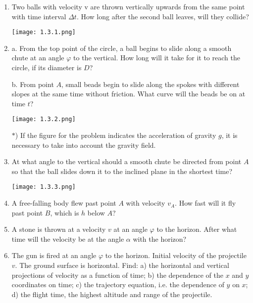 \documentclass{article}
\begin{document}
\begin{enumerate}[label=1.3.\arabic*]

\item Two balls with velocity v are thrown vertically upwards from the same point with time interval $\Delta t$. How long after the second ball leaves, will they collide?

\begin{center}
    \texttt{[image: 1.3.1.png]}
\end{center}

\item a. From the top point of the circle, a ball begins to slide along a smooth chute at an angle $\varphi$ to the vertical. How long will it take for it to reach the circle, if its diameter is $D$?

b. From point $A$, small beads begin to slide along the spokes with different slopes at the same time without friction. What curve will the beads be on at time $t$?

\begin{center}
    \texttt{[image: 1.3.2.png]}
\end{center}

$\ast$) If the figure for the problem indicates the acceleration of gravity $g$, it is necessary to take into account the gravity field.

\item At what angle to the vertical should a smooth chute be directed from point $A$ so that the ball slides down it to the inclined plane in the shortest time?

\begin{center}
    \texttt{[image: 1.3.3.png]}
\end{center}

\item A free-falling body flew past point $A$ with velocity $v_A$. How fast will it fly past point $B$, which is $h$ below $A$?

\item A stone is thrown at a velocity $v$ at an angle $\varphi$ to the horizon. After what time will the velocity be at the angle $\alpha$ with the horizon?

\item The gun is fired at an angle $\varphi$ to the horizon. Initial velocity of the projectile $v$. The ground surface is horizontal. Find: a) the horizontal and vertical projections of velocity as a function of time; b) the dependence of the $x$ and $y$ coordinates on time; c) the trajectory equation, i.e. the dependence of $y$ on $x$; d) the flight time, the highest altitude and range of the projectile.


\end{enumerate}
\end{document}
